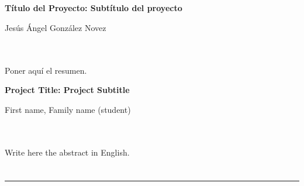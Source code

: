 \chapter*{}






\cleardoublepage
\thispagestyle{empty}

\begin{center}
{\large\bfseries Título del Proyecto: Subtítulo del proyecto}\\
\end{center}
\begin{center}
Jesús Ángel González Novez\\
\end{center}

\\

\vspace{0.7cm}
\\

Poner aquí el resumen.
\cleardoublepage


\thispagestyle{empty}


\begin{center}
{\large\bfseries Project Title: Project Subtitle}\\
\end{center}
\begin{center}
First name, Family name (student)\\
\end{center}

\\

\vspace{0.7cm}
\\

Write here the abstract in English.

\chapter*{}
\thispagestyle{empty}

\noindent\rule[-1ex]{\textwidth}{2pt}\\[4.5ex]


